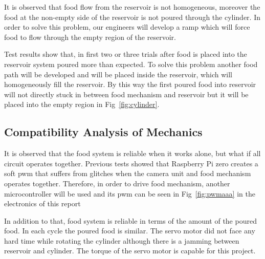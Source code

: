 It is observed that food flow from the reservoir is not homogeneous, moreover the food at the non-empty side of the reservoir is not poured through the cylinder. In order to solve this problem, our engineers will develop a ramp which will force food to flow through the empty region of the reservoir.

Test results show that, in first two or three trials after food is placed into the reservoir system poured more than expected. To solve this problem another food path will be developed and will be placed inside the reservoir, which will homogeneously fill the reservoir. By this way the first poured food into reservoir will not directly stuck in between food mechanism and reservoir but it will be placed into the empty region in Fig~\ref{fig:cylinder}.

\subsection{Compatibility Analysis of Mechanics}
It is observed that the food system is reliable when it works alone, but what if all circuit operates together. Previous tests showed that Raspberry Pi zero creates a soft pwm that suffers from glitches when the camera unit and food mechanism operates together. Therefore, in order to drive food mechanism, another microcontroller will be used and its pwm can be seen in Fig~\ref{fig:pwmaaa} in the electronics of this report

In addition to that, food system is reliable in terms of the amount of the poured food. In each cycle the poured food is similar. The servo motor did not face any hard time while rotating the cylinder although there is a jamming between reservoir and cylinder. The torque of the servo motor is capable for this project.